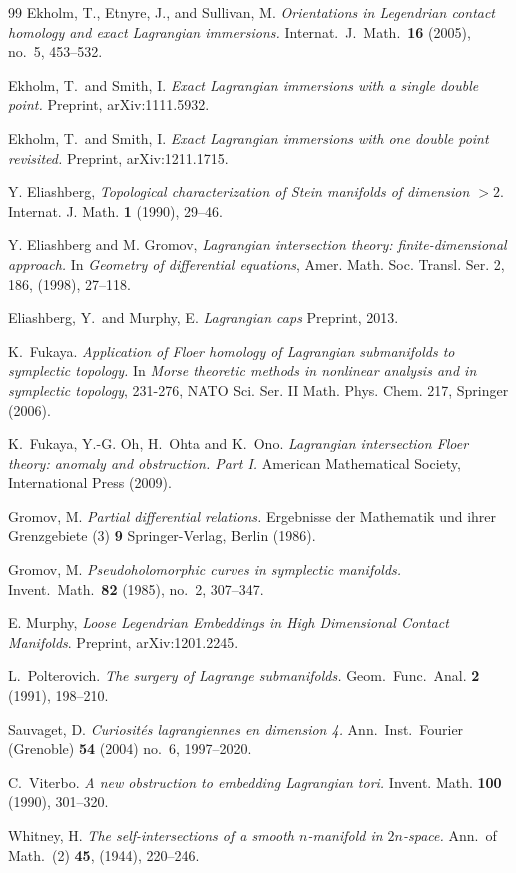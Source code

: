\documentclass[reqno,11pt]{amsart}
\numberwithin{equation}{section}
\theoremstyle{my}
\theoremstyle{my}
\theoremstyle{your}
\begin{document}
\begin{thebibliography}{99}
Ekholm, T., Etnyre, J., and Sullivan, M.
\emph{Orientations in Legendrian contact homology and exact Lagrangian immersions.}
Internat.~J.~Math.~{\bf 16} (2005), no.~5, 453--532.

Ekholm, T.~and Smith, I.
\emph{Exact Lagrangian immersions with a single double point.}
Preprint, arXiv:1111.5932. 

Ekholm, T.~and Smith, I.
\emph{Exact Lagrangian immersions with one double point revisited.}
Preprint, arXiv:1211.1715. 


Y. Eliashberg, {\em Topological characterization of Stein manifolds of dimension $>2$}.
Internat. J. Math. {\bf 1} (1990), 29--46.

  Y. Eliashberg and M. Gromov, {\em Lagrangian intersection theory: finite-dimensional approach.}  
In \emph{Geometry of differential equations}, Amer. Math. Soc. Transl. Ser. 2, 186,  (1998), 27--118.


 Eliashberg, Y.~and Murphy, E.
\emph{Lagrangian caps}
Preprint, 2013.



K.~Fukaya.
\emph{Application of Floer homology of Lagrangian submanifolds to symplectic topology.}
In \emph{Morse theoretic methods in nonlinear analysis and in symplectic topology}, 231-276, NATO Sci. Ser. II Math. Phys. Chem. 217, Springer (2006).

 K.~Fukaya, Y.-G. Oh,  H.~Ohta and K.~Ono.
\emph{Lagrangian intersection Floer theory: anomaly and obstruction. Part I.}
American Mathematical Society, International Press (2009).

Gromov, M.
\emph{Partial differential relations.} 
Ergebnisse der Mathematik und ihrer Grenzgebiete (3) {\bf 9} Springer-Verlag, Berlin (1986).


Gromov, M. 
 {\em Pseudoholomorphic curves in symplectic manifolds.}
Invent.~Math.~{\bf 82} (1985), no.~2, 307--347.



E. Murphy, {\em Loose Legendrian 
Embeddings in High Dimensional Contact Manifolds}.
Preprint, arXiv:1201.2245.

L.~Polterovich.
\emph{The surgery of Lagrange submanifolds.}
Geom.~Func.~Anal. \textbf{2} (1991),  198--210.


Sauvaget, D.
\emph{Curiosit\'es lagrangiennes en dimension 4.}
Ann.~Inst.~Fourier (Grenoble) {\bf 54} (2004) no.~6, 1997--2020.

C.~Viterbo.
\emph{A new obstruction to embedding Lagrangian tori.}
Invent. Math. {\bf 100} (1990), 301--320.

Whitney, H. 
\emph{The self-intersections of a smooth $n$-manifold in $2n$-space.} 
Ann.~of Math.~(2) {\bf 45}, (1944), 220--246.

\end{thebibliography}
\end{document}
